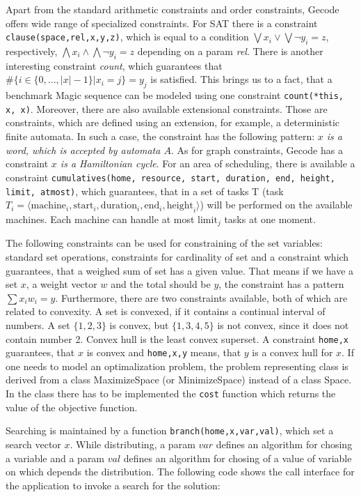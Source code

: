Apart from the standard arithmetic constraints and order constraints, Gecode offers
wide range of specialized constraints. For SAT there is a constraint \texttt{clause(space,rel,x,y,z)},
which is equal to a condition $\bigvee {x_i} \vee \bigvee{\neg y_i} = z$, respectively, $\bigwedge {x_i} \wedge \bigwedge{\neg y_i} = z$
depending on a param {\em rel}. There is another interesting constraint {\em count}, which 
guarantees that $\#\{i \in \{0, ..., |x|-1\}|x_i = j\} = y_j$ is satisfied. This brings us to a fact,
that a benchmark Magic sequence can be modeled using one constraint \texttt{count(*this, x, x)}.
Moreover, there are also available extensional constraints. Those are constraints, which are 
defined using an extension, for example, a deterministic finite automata. In such a case, the constraint
has the following pattern:  {\em $x$ is a word, which is accepted by automata $A$}. As for graph constraints, 
Gecode has a constraint {\em $x$ is a Hamiltonian cycle}. For an area of scheduling, there is available
a constraint \texttt{cumulatives(home, resource, start, duration, end, height, limit, atmost)}, which
guarantees, that in a set of tasks T (task $T_i = \langle \mathrm{machine}_i, \mathrm{start}_i,
\mathrm{duration}_i, \mathrm{end}_i, \mathrm{height}_i \rangle$) will be performed on 
the available machines. Each machine can handle at most $\mathrm{limit}_j$ tasks at
one moment.

The following constraints can be used for constraining of the set variables: standard 
set operations, constraints for cardinality of set and a constraint
which guarantees, that a weighed sum of set has a given value. That means if we have a set $x$, 
a weight vector $w$ and the total should be $y$, the constraint has a pattern $\sum{x_i w_i} = y$. 
Furthermore, there are two constraints available, both of which are related to convexity. A set is convexed, 
if it contains a continual interval of numbers. A set $\{1,2,3\}$ is convex, but $\{1,3,4,5\}$ is not 
convex, since it does not contain number 2. Convex hull is the least convex superset. A constraint
\texttt{home,x} guarantees, that $x$ is convex and \texttt{home,x,y} means, that $y$ is a convex hull for $x$.
If one needs to model an optimalization problem, the problem representing class is derived from a class MaximizeSpace (or MinimizeSpace)
instead of a class Space. In the class there has to be implemented the \texttt{cost} function which returns
the value of the objective function. 

Searching is maintained by a function \texttt{branch(home,x,var,val)}, which set a search vector $x$. While distributing,
a param $var$ defines an algorithm for chosing a variable and a param $val$ defines an algorithm
for chosing of a value of variable on which depends the distribution. The following code shows the call interface
for the application to invoke a search for the solution: 

